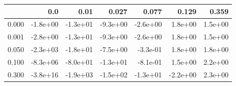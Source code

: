 \begin{tabular}{lrrrrrr}
\toprule
{} &      0.0 &     0.01 &    0.027 &    0.077 &    0.129 &   0.359 \\
\midrule
0.000 & -1.8e+00 & -1.3e+01 & -9.3e+00 & -2.6e+00 &  1.8e+00 & 1.5e+00 \\
0.001 & -2.8e+00 & -1.3e+01 & -9.3e+00 & -2.6e+00 &  1.8e+00 & 1.5e+00 \\
0.050 & -2.3e+03 & -1.8e+01 & -7.5e+00 & -3.3e-01 &  1.8e+00 & 1.8e+00 \\
0.100 & -8.3e+06 & -8.0e+01 & -1.3e+01 & -8.1e-01 &  1.5e+00 & 2.2e+00 \\
0.300 & -3.8e+16 & -1.9e+03 & -1.5e+02 & -1.3e+01 & -2.2e+00 & 2.3e+00 \\
\bottomrule
\end{tabular}
